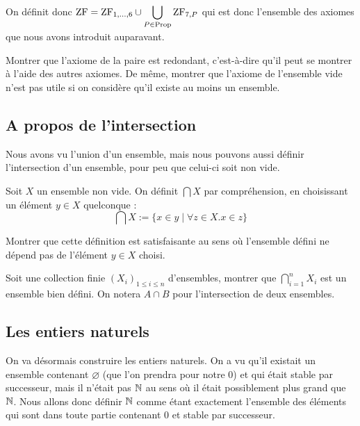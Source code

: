 On définit donc $\mathrm{ZF} = \mathrm{ZF}_{1,\ldots,6}\cup\displaystyle{\bigcup_{P\in \mathrm{Prop}}\mathrm{ZF}_{7,P}}$ qui est donc l'ensemble des axiomes que nous avons introduit auparavant.

\begin{exo}
    Montrer que l'axiome de la paire est redondant, c'est-à-dire qu'il peut se montrer à l'aide des autres axiomes. De même, montrer que l'axiome de l'ensemble vide n'est pas utile si on considère qu'il existe au moins un ensemble.
\end{exo}

\subsection{A propos de l'intersection}

Nous avons vu l'union d'un ensemble, mais nous pouvons aussi définir l'intersection d'un ensemble, pour peu que celui-ci soit non vide.

\begin{defi}[Intersection]
    Soit $X$ un ensemble non vide. On définit $\bigcap X$ par compréhension, en choisissant un élément $y\in X$ quelconque : $$\bigcap X := \{ x\in y\mid \forall z\in X.x\in z\}$$
\end{defi}

\begin{exo}
    Montrer que cette définition est satisfaisante au sens où l'ensemble défini ne dépend pas de l'élément $y\in X$ choisi.
\end{exo}

\begin{exo}
    Soit une collection finie $(X_i)_{1\leq i \leq n}$ d'ensembles, montrer que $\displaystyle{\bigcap_{i=1}^n X_i}$ est un ensemble bien défini. On notera $A\cap B$ pour l'intersection de deux ensembles.
\end{exo}

\subsection{Les entiers naturels}

On va désormais construire les entiers naturels. On a vu qu'il existait un ensemble contenant $\varnothing$ (que l'on prendra pour notre $0$) et qui était stable par successeur, mais il n'était pas $\mathbb{N}$ au sens où il était possiblement plus grand que $\mathbb{N}$. Nous allons donc définir $\mathbb{N}$ comme étant exactement l'ensemble des éléments qui sont dans toute partie contenant $0$ et stable par successeur.

